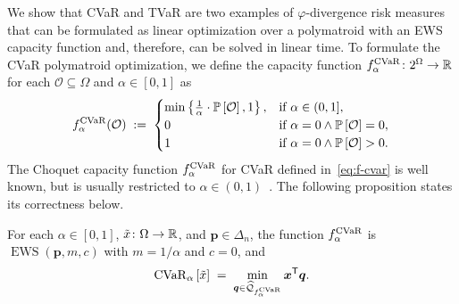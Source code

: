 \documentclass[10pt]{article} %
\DeclareMathOperator{\ews}{EWS}
\renewcommand{\cite}{\citep}
\begin{document}
We show that CVaR and TVaR are two examples of $\varphi$-divergence risk measures that can be formulated as linear optimization over a polymatroid with an EWS capacity function and, therefore, can be solved in linear time. To formulate the CVaR polymatroid optimization, we define the capacity function $f_{\alpha}^{\operatorname{CVaR}}\colon 2^{\Omega } \to \mathbb{R}$  for each $\mathcal{O} \subseteq \Omega$ and $\alpha \in [0,1]$ as
\begin{equation} \label{eq:f-cvar}
  f_{\alpha}^{\operatorname{CVaR}}(\mathcal{O})
    \;:=\;
      \begin{cases}
        \min\left\{\frac{1}{\alpha} \cdot \mathbb{P}\left[ \mathcal{O} \right], 1\right\}, & \text{if } \alpha \in (0,1], \\
        0 & \text{if } \alpha = 0 \wedge \mathbb{P}\left[ \mathcal{O} \right] = 0,  \\
        1 & \text{if } \alpha = 0 \wedge \mathbb{P}\left[ \mathcal{O} \right] > 0. \\
      \end{cases} \\
\end{equation}
The Choquet capacity function $f_{\alpha }^{\operatorname{CVaR}}$ for CVaR defined in~\eqref{eq:f-cvar} is well known, but is usually restricted to $\alpha\in (0,1)$~\cite{acerbi2002spectral}. The following proposition states its correctness below.
\begin{proposition} \label{prop:cvar-ews-correct}
For each $\alpha\in [0,1]$, $\tilde{x} \colon \Omega \to \mathbb{R}$, and $\bm{p} \in \Delta_n$, the function $f^{\operatorname{CVaR}}_{\alpha }$ is $\ews(\bm{p}, m, c)$ with $m = 1/\alpha$ and $c = 0$, and 
\begin{equation} \label{eq:cvar-correct}
  \operatorname{CVaR}_{\alpha } \left[\tilde{x} \right]
  \;=\;
  \min_{\bm{q} \in \widehat{\mathcal{Q}}_{f_{\alpha }^{\operatorname{CVaR}}}} \bm{x}^{\mathsf{T}} \bm{q}.
\end{equation}
\end{proposition}
\end{document}
